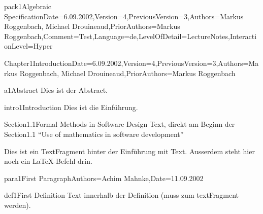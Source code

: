 \documentclass[landscape, slides, light]{mmiss2}
\begin{document}
\begin{Package}{pack1}{Algebraic
Specification}{Date=6.09.2002,Version=4,PreviousVersion=3,Authors={Markus
Roggenbach, Michael Drouineaud},PriorAuthors={Markus
Roggenbach},Comment=Test,Language=de,LevelOfDetail=LectureNotes,InteractionLevel=Hyper}


\begin{Section}{Chapter1}{Introduction}{Date=6.09.2002,Version=4,PreviousVersion=3,Authors={Markus
Roggenbach, Michael Drouineaud},PriorAuthors={Markus Roggenbach}}
\begin{Abstract}[]{a1}{Abstract}{}
  Dies ist der Abstract.
  \end{Abstract}\begin{Introduction}[]{intro1}{Introduction}{}
    Dies ist die Einf\"uhrung.
  \end{Introduction}

  \begin{Section}{Section1.1}{Formal Methods in Software Design}{}
  Text, direkt am Beginn der Section1.1 
  ``Use of mathematics in software development''\\
  \begin{TextFragment}
  Dies ist ein TextFragment hinter der Einf\"uhrung mit
   Text. Ausserdem steht hier noch
  ein \LaTeX{}-Befehl drin.
  \end{TextFragment}
  \begin{Paragraph}[]{para1}{First Paragraph}{Authors=Achim Mahnke,Date=11.09.2002}
    \begin{Definition}[]{def1}{First Definition}{}
      Text innerhalb der Definition (muss zum textFragment werden).


\end{Definition}
\end{Paragraph}
\end{Section}
\end{Section}
\end{Package}
\end{document}
